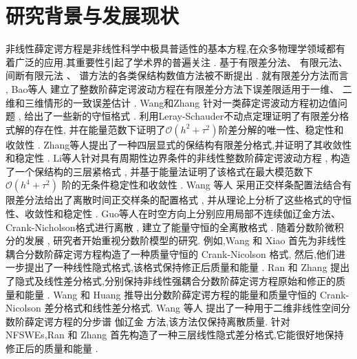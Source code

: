 \section{研究背景与发展现状}
非线性薛定谔方程是非线性科学中极具普适性的基本方程,在众多物理学领域都有着广泛的应用.其重要性引起了学术界的普遍关注 . 基于有限差分法\cite{liFastEnergyConserving2018}、 有限元法\cite{karakashianSpacetimeFiniteElement1998}、 间断有限元法\cite{zhangConservativeLocalDiscontinuous2017} 、 谱方法\cite{gongConservativeFourierPseudospectral2017}的各类保结构数值方法被不断提出 . 
就有限差分方法而言 , Bao等人\cite{baoUniformErrorEstimates2012} 建立了整数阶薛定谔波动方程在有限差分方法下误差限适用于一维、 二维和三维情形的一致误差估计 . 
Wang和Zhang\cite{wangAnalysisNewConservative2006} 针对一类薛定谔波动方程初边值问题 , 给出了一些新的守恒格式 . 利用Leray-Schauder不动点定理证明了有限差分格式解的存在性,
并在能量范数下证明了$\mathcal{O}(h^2+\tau^2)$阶差分解的唯一性、稳定性和收敛性 . Zhang等人\cite{zhangConservativeNumericalScheme2003}提出了一种四层显式的保结构有限差分格式,并证明了其收敛性和稳定性 . 
Li等人\cite{liCompactFiniteDifference2012}针对具有周期性边界条件的非线性整数阶薛定谔波动方程 , 构造了一个保结构的三层紧格式 , 并基于能量法证明了该格式在最大模范数下$\mathcal{O}(h^4+\tau^2)$ 阶的无条件稳定性和收敛性 . 
Wang 等人\cite{wangDiscretetimeOrthogonalSpline2011} 采用正交样条配置法结合有限差分法给出了离散时间正交样条的配置格式 , 并从理论上分析了这些格式的守恒性、收敛性和稳定性 . 
Guo等人\cite{guoEnergyConservingLocal2015}在时空方向上分别应用局部不连续伽辽金方法、Crank-Nicholson格式进行离散 , 建立了能量守恒的全离散格式 . 
随着分数阶微积分的发展 , 研究者开始重视分数阶模型的研究.
例如,Wang 和 Xiao \cite{wangCrankNicolsonDifference2013} 首先为非线性耦合分数阶薛定谔方程构造了一种质量守恒的 Crank-Nicolson 格式,
然后,他们进一步提出了一种线性隐式格式,该格式保持修正后质量和能量\cite{wangLinearlyImplicitConservative2014} . 
Ran 和 Zhang \cite{ranConservativeDifferenceScheme2016} 提出了隐式及线性差分格式,分别保持非线性强耦合分数阶薛定谔方程原始和修正的质量和能量 . 
Wang 和 Huang \cite{wangEnergyConservativeDifference2015,wangConservativeLinearizedDifference2015} 推导出分数阶薛定谔方程的能量和质量守恒的 Crank-Nicolson 差分格式和线性差分格式.
Wang 等人 \cite{wangSplitstepSpectralGalerkin2019} 提出了一种用于二维非线性空间分数阶薛定谔方程的分步谱 伽辽金 方法,该方法仅保持离散质量.
针对 NFSWEs,Ran 和 Zhang \cite{ranLinearlyImplicitConservative2016} 首先构造了一种三层线性隐式差分格式,它能很好地保持修正后的质量和能量 . 
